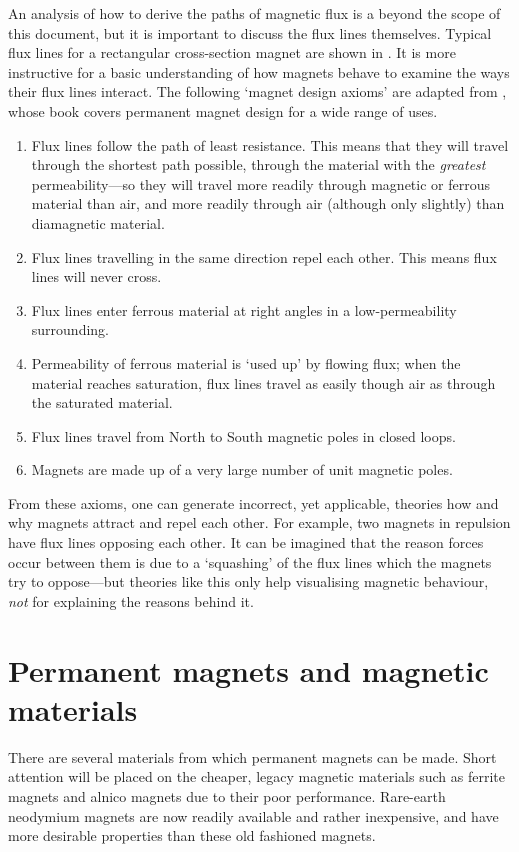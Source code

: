\documentclass[11pt,a4paper]{memoir}
\begin{document}
An analysis of how to derive the paths of magnetic flux is a beyond the scope of this document, but it is important to discuss the flux lines themselves.
Typical flux lines for a rectangular cross-section magnet are shown in .
It is more instructive for a basic understanding of how magnets behave to examine the ways their flux lines interact.
The following `magnet
design axioms' are adapted from \textcite{moskowitz1995}, whose book
covers permanent magnet design for a wide range of uses.
\begin{enumerate}
\item Flux lines follow the path of least resistance. This means that they will
travel through the shortest path possible,
through the material with the
\emph{greatest} permeability—so they will travel more readily through
magnetic or ferrous material than air, and more readily through air
(although only slightly) than diamagnetic material.
\item Flux lines travelling in the same direction repel each other. This means
flux lines will never cross.
\item Flux lines enter ferrous material at right angles in a low-permeability surrounding.
\item Permeability of ferrous material is `used up' by flowing flux; when the
material reaches saturation, flux lines travel as easily though air as through
the saturated material.
\item Flux lines travel from North to South magnetic poles in closed loops.
\item Magnets are made up of a very large number of unit magnetic poles.
\end{enumerate}
From these axioms, one can generate incorrect, yet applicable,
theories how and why magnets attract and repel each other. For
example, two magnets in repulsion have flux lines opposing each
other.
It can be imagined that the reason forces occur between them is
due to a `squashing' of the flux lines which the magnets try to
oppose—but theories like this only help visualising magnetic
behaviour, \emph{not} for explaining the reasons behind it.

\section{Permanent magnets and magnetic materials}

There are several materials from which permanent magnets can be
made. Short attention will be placed on the cheaper, legacy magnetic
materials such as ferrite magnets and alnico magnets due to their
poor performance. Rare-earth neodymium magnets are now readily
available and rather inexpensive, and have more desirable properties
than these old fashioned magnets.
\end{document}
